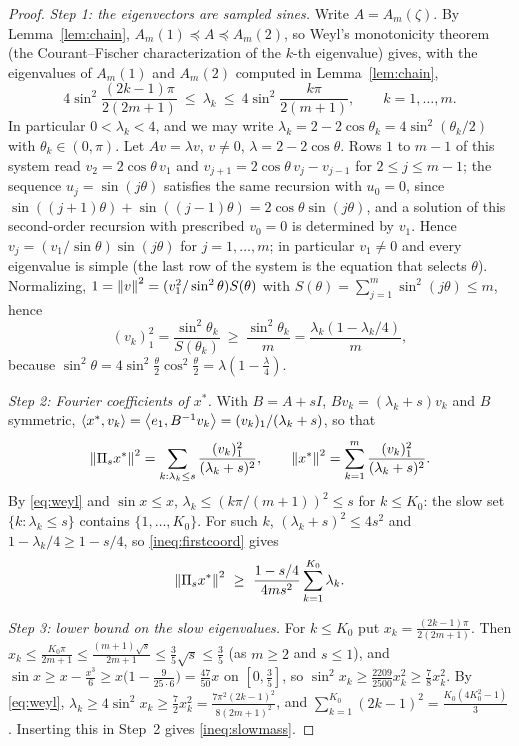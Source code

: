 \begin{proof}
\emph{Step 1: the eigenvectors are sampled sines.} Write $A=A_m(\zeta)$. By Lemma~\ref{lem:chain}, $A_m(1)\preceq A\preceq A_m(2)$, so Weyl's monotonicity theorem (the Courant--Fischer characterization of the $k$-th eigenvalue) gives, with the eigenvalues of $A_m(1)$ and $A_m(2)$ computed in Lemma~\ref{lem:chain},
\begin{equation}
\label{eq:weyl}
4\sin^2\frac{(2k-1)\pi}{2(2m+1)}\ \le\ \lambda_k\ \le\ 4\sin^2\frac{k\pi}{2(m+1)},\qquad k=1,\dots,m .
\end{equation}
In particular $0<\lambda_k<4$, and we may write $\lambda_k=2-2\cos\theta_k=4\sin^2(\theta_k/2)$ with $\theta_k\in(0,\pi)$. Let $Av=\lambda v$, $v\neq0$, $\lambda=2-2\cos\theta$. Rows $1$ to $m-1$ of this system read $v_2=2\cos\theta\,v_1$ and $v_{j+1}=2\cos\theta\,v_j-v_{j-1}$ for $2\le j\le m-1$; the sequence $u_j=\sin(j\theta)$ satisfies the same recursion with $u_0=0$, since $\sin((j+1)\theta)+\sin((j-1)\theta)=2\cos\theta\sin(j\theta)$, and a solution of this second-order recursion with prescribed $v_0=0$ is determined by $v_1$. Hence $v_j=(v_1/\sin\theta)\sin(j\theta)$ for $j=1,\dots,m$; in particular $v_1\neq0$ and every eigenvalue is simple (the last row of the system is the equation that selects $\theta$). Normalizing, $1=\left\|v\right\|^2=(v_1^2/\sin^2\theta)S(\theta)$ with $S(\theta)=\sum_{j=1}^m\sin^2(j\theta)\le m$, hence
\begin{equation}
\label{ineq:firstcoord}
(v_k)_1^2=\frac{\sin^2\theta_k}{S(\theta_k)}\ \ge\ \frac{\sin^2\theta_k}m=\frac{\lambda_k(1-\lambda_k/4)}m ,
\end{equation}
because $\sin^2\theta=4\sin^2\frac\theta2\cos^2\frac\theta2=\lambda(1-\frac\lambda4)$.

\emph{Step 2: Fourier coefficients of $x^\ast$.} With $B=A+sI$, $Bv_k=(\lambda_k+s)v_k$ and $B$ symmetric, $\left\langle x^\ast, v_k \right\rangle=\left\langle e_1, B^{-1}v_k \right\rangle=(v_k)_1/(\lambda_k+s)$, so that
\[
\left\|\Pi_sx^\ast\right\|^2=\sum_{k:\lambda_k\le s}\frac{(v_k)_1^2}{(\lambda_k+s)^2},\qquad \left\|x^\ast\right\|^2=\sum_{k=1}^m\frac{(v_k)_1^2}{(\lambda_k+s)^2}.
\]
By \eqref{eq:weyl} and $\sin x\le x$, $\lambda_k\le(k\pi/(m+1))^2\le s$ for $k\le K_0$: the slow set $\{k:\lambda_k\le s\}$ contains $\{1,\dots,K_0\}$. For such $k$, $(\lambda_k+s)^2\le4s^2$ and $1-\lambda_k/4\ge1-s/4$, so \eqref{ineq:firstcoord} gives
\[
\norm{\Pi_sx^\ast}^2\ \ge\ \frac{1-s/4}{4ms^2}\sum_{k=1}^{K_0}\lambda_k .
\]

\emph{Step 3: lower bound on the slow eigenvalues.} For $k\le K_0$ put $x_k=\frac{(2k-1)\pi}{2(2m+1)}$. Then $x_k\le\frac{K_0\pi}{2m+1}\le\frac{(m+1)\sqrt s}{2m+1}\le\frac35\sqrt s\le\frac35$ (as $m\ge2$ and $s\le1$), and $\sin x\ge x-\frac{x^3}6\ge x\big(1-\frac{9}{25\cdot6}\big)=\frac{47}{50}x$ on $[0,\frac35]$, so $\sin^2x_k\ge\frac{2209}{2500}x_k^2\ge\frac78x_k^2$. By \eqref{eq:weyl}, $\lambda_k\ge4\sin^2x_k\ge\frac72x_k^2=\frac{7\pi^2(2k-1)^2}{8(2m+1)^2}$, and $\sum_{k=1}^{K_0}(2k-1)^2=\frac{K_0(4K_0^2-1)}3$. Inserting this in Step~2 gives \eqref{ineq:slowmass}.


\end{proof}
